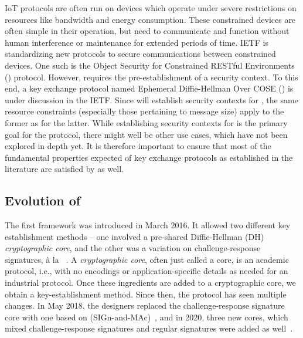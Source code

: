 IoT protocols are often run on devices which operate under severe restrictions on resources like bandwidth and energy consumption.
%
These constrained devices are often simple in their operation, but need to communicate and function without human interference or maintenance for extended periods of time.
%
IETF is standardizing new protocols to secure communications between constrained devices.
%
One such is the Object Security for Constrained RESTful Environments (\mOscore{}) protocol. 
%
However, \mOscore{} requires the pre-establishment of a security context.
%
To this end, a key exchange protocol named Ephemeral Diffie-Hellman Over COSE
(\mEdhoc{}) is under discussion in the IETF. 
%
Since \mEdhoc{} will establish security contexts for \mOscore{}, the same resource constraints (especially those pertaining to message size) apply to the former as for the latter.
%
While establishing security contexts for \mOscore{} is the primary goal for the \mEdhoc{} protocol, there might well be other use cases, which have not been explored in depth yet.
%
It is therefore important to ensure that most of the fundamental properties expected of key exchange protocols as established in the literature are satisfied by \mEdhoc{} as well.
%

\subsection{Evolution of \mEdhoc}
\label{sec:edhocevol}
The first \mEdhoc{} framework was introduced in March 2016. 
%
It allowed two different key establishment methods -- one involved a pre-shared Diffie-Hellman (DH) \emph{cryptographic core}, and the other was a variation on challenge-response signatures, {\`a} la \mOptls{}~\cite{DBLP:conf/eurosp/KrawczykW16}. 
%
A \emph{cryptographic core}, often just called a core, is an academic protocol,
i.e., with no encodings or application-specific details as needed for an industrial protocol. 
%
Once these ingredients are added to a cryptographic core, we obtain a key-establishment method.
%
Since then, the protocol has seen multiple changes.
%
In May 2018, the designers replaced the challenge-response signature core with
one based on \mSigma{}
(SIGn-and-MAc)~\cite{sigma,bruni-analysis-selander-ace-cose-ecdhe-08}, and in
2020, three new cores, which mixed challenge-response signatures and regular signatures were added as well~\cite{our-analysis-selander-lake-edhoc-00}.

